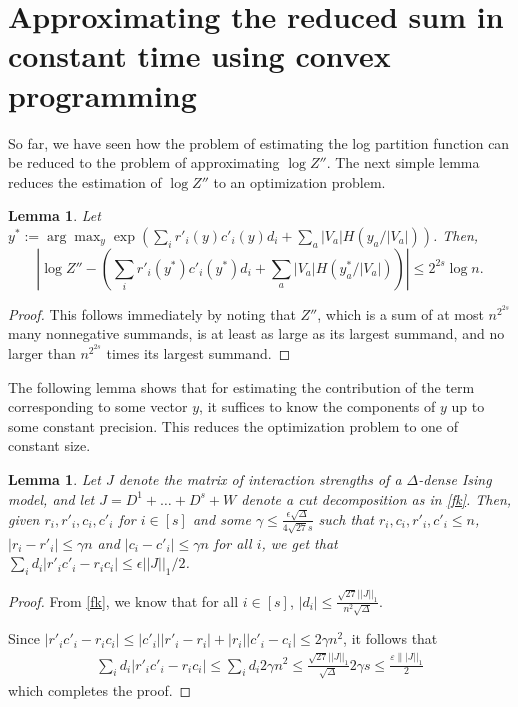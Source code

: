 \documentclass[final, 12pt]{colt2018}
\newcommand{\eps}{\varepsilon}
\newtheorem{lemma}[theorem]{Lemma}
\theoremstyle{definition}
\theoremstyle{plain}
\begin{document}
\section{Approximating the reduced sum in constant time using convex programming}
So far, we have seen how the problem of estimating the log partition function can be reduced to the problem of approximating $\log Z''$. 
The next simple lemma reduces the estimation of $\log{Z''}$ to an optimization problem.
\begin{lemma}\label{approx-sum-by-max}
Let $y^{\ast}:=\arg\max_{y}\exp\left(\sum_{i}r'_i(y)c'_i(y)d_{i}+\sum_{a}|V_{a}|H(y_{a}/|V_{a}|)\right)$.
Then, 
\[
\left|\log Z''-\left(\sum_{i}r'_i(y^{\ast})c'_i(y^{\ast})d_{i}+\sum_{a}|V_{a}|H(y_{a}^{\ast}/|V_{a}|)\right)\right|\leq2^{2s}\log n.
\]
\end{lemma}
\begin{proof}
This follows immediately by noting that $Z''$, which is a sum of at most $n^{2^{2s}}$ many nonnegative summands, is at least as large as its largest summand, and no larger than $n^{2^{2s}}$ times its largest summand. 
\end{proof}
The following lemma shows that for estimating the contribution of the term corresponding to some vector $y$, it suffices to know the components of $y$ up to some constant precision. This reduces the optimization problem to one of constant size.  
\begin{lemma}\label{lemma:gamma-def}
Let $J$ denote the matrix of interaction strengths of a $\Delta$-dense Ising model, and let $J = D^{1}+\dots+D^{s} + W$ denote a cut decomposition as in \cref{fk}. Then, given $r_{i},r'_{i},c_{i},c'_{i}$ for $i\in[s]$ and some 
$\gamma \le \frac{\epsilon \sqrt{\Delta}}{4 \sqrt{27} s}$ such that $r_i,c_i,r'_i,c'_i \le n$, 
$|r_i - r'_i| \le \gamma n$ and $|c_i - c'_i| \le \gamma n$ 
for all $i$, we get that 
$\sum_i d_i|r'_i c'_i - r_i c_i| \le \epsilon ||J||_{1}/2$. 
\end{lemma}
\begin{proof}
From \cref{fk}, we know that for all $i\in[s]$,  
$|d_i| \le \frac{\sqrt{27} ||J||_{1}}{n^2 \sqrt{\Delta}}$.
\iffalse
so using that $|R_t| \le n, |C_t| \le n$ we see that if we estimate
the number of $+$ and $-$ in $R_t,C_t$ within an additive error of $\gamma n$,
\fi
Since $ |r'_i c'_i - r_i c_i| \le |c'_i||r'_i - r_i| + |r_i||c'_i - c_i| \le 2\gamma n^2$, it follows that
\begin{align*}
\sum_i d_i|r'_i c'_i - r_i c_i|
\le \sum_i d_i 2\gamma n^2
\le \frac{\sqrt{27} ||J||_{1} }{\sqrt{\Delta}} 2\gamma s
\le %
\frac{\eps \||J||_{1}}{2}
\end{align*} which completes the proof. 
\end{proof}
\end{document}
